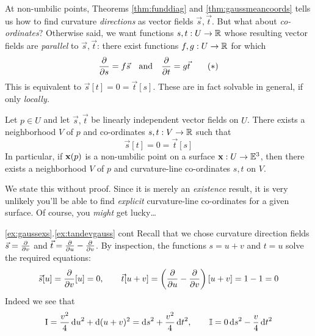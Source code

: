 


At non-umbilic points, Theorems \ref{thm:funddiag} and \ref{thm:gaussmeancoords} tells us how to find curvature \emph{directions} as vector fields $\vec s,\vec t$. But what about \emph{co-ordinates}? Otherwise said, we want functions $s,t:U\to\mathbb{R}$ whose resulting vector fields are \emph{parallel} to $\vec s,\vec t$: there exist functions $f,g:U\to\mathbb{R}$ for which
\[\frac{\partial }{\partial s}=f\vec s\quad \text{and}\quad \frac{\partial }{\partial t}=g\vec t \tag{$\ast$}\]
This is equivalent to $\vec s[t]=0=\vec t[s]$. These are in fact solvable in general, if only \emph{locally.}

\begin{thm}{}{}
Let $p\in U$ and let $\vec s,\vec t$ be linearly independent vector fields on $U$. There exists a neighborhood $V$ of $p$ and co-ordinates $s,t:V\to\mathbb{R}$ such that
	\[\vec s[t]=0=\vec t[s]\]
	In particular, if ${\mathbf{x}}(p)$ is a non-umbilic point on a surface ${\mathbf{x}}:U\to\mathbb{E}^3$, then there exists a neighborhood $V$ of $p$ and curvature-line co-ordinates $s,t$ on $V$.
\end{thm}


We state this without proof. Since it is merely an \emph{existence} result, it is very unlikely you'll be able to find \emph{explicit} curvature-line co-ordinates for a given surface. Of course, you \emph{might} get lucky\ldots


\begin{example*}{\ref*{ex:gaussexs}.\ref{ex:tandevgauss} cont}{}
Recall that we chose curvature direction fields $\vec s=\frac{\partial }{\partial v}$ and $\vec t=\frac{\partial }{\partial u}-\frac{\partial }{\partial v}$. By inspection, the functions $s=u+v$ and $t=u$ solve the required equations:
\[\vec s[u]=\frac{\partial }{\partial v}[u]=0,\qquad\vec t[u+v]=\left(\frac{\partial }{\partial u}-\frac{\partial }{\partial v}\right)[u+v]=1-1=0\]
Indeed we see that
\[\mathrm{I}=\frac{v^2}4\,{\mathrm{d} u}^2+\mathrm{d}(u+v)^2 ={\mathrm{d} s}^2+\frac{v^2}4\,{\mathrm{d} t}^2,\qquad \mathbb{I}=0\,{\mathrm{d} s}^2-\frac v4\,{\mathrm{d} t}^2\]
\end{example*}

